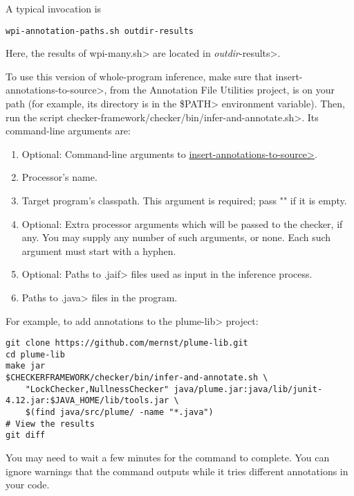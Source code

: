 A typical invocation is

\begin{Verbatim}
wpi-annotation-paths.sh outdir-results
\end{Verbatim}

Here, the results of \<wpi-many.sh> are located in \<\emph{outdir}-results>.


\begin{sloppypar}
To use this version of whole-program inference, make sure that
\<insert-annotations-to-source>, from the Annotation File Utilities project,
is on your path (for example, its directory is in the \<\$PATH> environment variable).
Then, run the script \<checker-framework/checker/bin/infer-and-annotate.sh>.
Its command-line arguments are:
\end{sloppypar}

\begin{enumerate}
\item Optional: Command-line arguments to
  \href{https://eisop.github.io/afu/#insert-annotations-to-source}{\<insert-annotations-to-source>}.
\item Processor's name.
\item Target program's classpath.  This argument is required; pass "" if it
  is empty.
\item Optional: Extra processor arguments which will be passed to the checker, if any.
  You may supply any number of such arguments, or none.  Each such argument
  must start with a hyphen.
\item Optional: Paths to \<.jaif> files used as input in the inference
    process.
\item Paths to \<.java> files in the program.
\end{enumerate}

For example, to add annotations to the \<plume-lib> project:
\begin{Verbatim}
git clone https://github.com/mernst/plume-lib.git
cd plume-lib
make jar
$CHECKERFRAMEWORK/checker/bin/infer-and-annotate.sh \
    "LockChecker,NullnessChecker" java/plume.jar:java/lib/junit-4.12.jar:$JAVA_HOME/lib/tools.jar \
    $(find java/src/plume/ -name "*.java")
# View the results
git diff
\end{Verbatim}

You may need to wait a few minutes for the command to complete.
You can ignore warnings that the command outputs while it tries different
annotations in your code.

